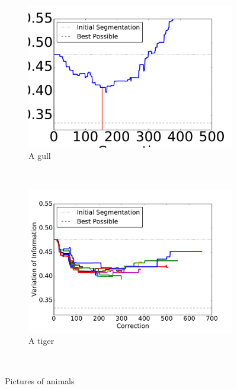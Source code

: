 \begin{figure}
    \centering
    \begin{subfigure}[b]{0.48\linewidth}
        \includegraphics[width=\textwidth]{gfx/gpauto.pdf}
        \caption{A gull}
        \label{fig:gull}
    \end{subfigure}
    ~ %
    \begin{subfigure}[b]{0.49\linewidth}
        \includegraphics[width=\textwidth]{gfx/gpusers.pdf}
        \caption{A tiger}
        \label{fig:tiger}
    \end{subfigure}
    ~ %
    \caption{Pictures of animals}\label{fig:animals}
\end{figure}

